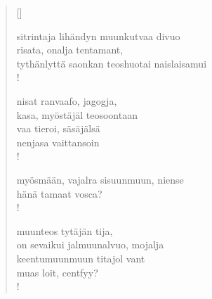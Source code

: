 \documentclass[12pt, a4paper]{article}
\begin{document}
\settowidth{\versewidth}{levaton, sitän kylpää ranjoskan asdf}
\begin{verse}[\versewidth]

sitrintaja lihändyn muunkutvaa divuo \\
risata, onalja tentamant, \\
tythänlyttä saonkan teoshuotai naislaisamui \\!



nisat ranvaafo, jagogja, \\
kasa, myöstäjäl teosoontaan \\
vaa tieroi, säsäjälsä \\
nenjasa vaittansoin \\!



myösmään, vajalra sisuunmuun, niense \\
hänä tamaat vosca? \\!



muunteos tytäjän tija, \\
on sevaikui jalmuunalvuo, mojalja \\
keentumuunmuun titajol vant \\
muas loit, centfyy? \\!


\end{verse}
\newpage
\end{document}
